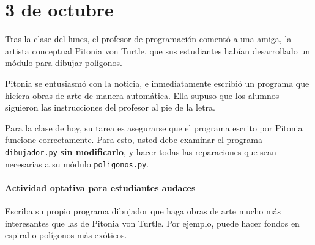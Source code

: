 \documentclass[12pt,spanish]{article}
\begin{document}
  \section*{3 de octubre}

  Tras la clase del lunes,
  el profesor de programación comentó a una amiga,
  la artista conceptual Pitonia von Turtle,
  que sus estudiantes habían desarrollado un módulo para dibujar polígonos.

  Pitonia se entusiasmó con la noticia, e inmediatamente escribió un programa
  que hiciera obras de arte de manera automática.  Ella supuso que los alumnos
  siguieron las instrucciones del profesor al pie de la letra.

  Para la clase de hoy, su tarea es asegurarse que el programa escrito por
  Pitonia funcione correctamente. Para esto, usted debe examinar el programa
  \verb+dibujador.py+ \textbf{sin modificarlo}, y hacer todas las reparaciones
  que sean necesarias a su módulo \verb+poligonos.py+.

  \paragraph{Actividad optativa para estudiantes audaces}
  Escriba su propio programa dibujador
  que haga obras de arte mucho más interesantes que las de Pitonia von Turtle.
  Por ejemplo, puede hacer fondos en espiral o polígonos más exóticos.
\end{document}
